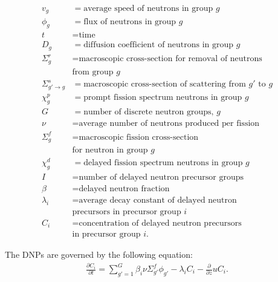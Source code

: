 \documentclass{anstrans}
\begin{document}
{
\small
\begin{align}
	v_g &= \text{average speed of neutrons in group }g \\
	\phi_g &= \text{flux of neutrons in group }g \\
	t &= \text{time} \\
	D_g &= \text{diffusion coefficient of neutrons in group }g \\
	\Sigma^r_g &= \text{macroscopic cross-section for removal of neutrons} 
	\nonumber \\
	&\text{from group }g \\
	\Sigma^s_{g' \rightarrow g} &= \text{macroscopic cross-section of
	scattering from }g' \text{ to }g \\
	\chi^p_g &= \text{prompt fission spectrum neutrons in group }g \\
	G &= \text{number of discrete neutron groups, }g \\
	\nu &= \text{average number of neutrons produced per fission} \\
	\Sigma^f_{g} &= \text{macroscopic fission cross-section} \nonumber \\
	&\text{for neutron in group }g \\
	\chi^d_g &= \text{delayed fission spectrum neutrons in group }g \\
	I &= \text{number of delayed neutron precursor groups} \\
	\beta &= \text{delayed neutron fraction} \\
	\lambda_i &= \text{average decay constant of delayed neutron} \nonumber \\
	&\text{precursors in precursor group }i \\
	C_i &= \text{concentration of delayed neutron precursors} \nonumber \\
	&\text{in precursor group }i .
\end{align}
}

	The \glspl{DNP} are governed by the following equation:
%
\begin{align}
	\frac{\partial C_i}{\partial t} = \sum^G_{g'=1} \beta_i \nu \Sigma^f_{g'}
	\phi_{g'} - \lambda_i C_i - \frac{\partial}{\partial z} u C_i. \label{eq2}
\end{align}
\end{document}
